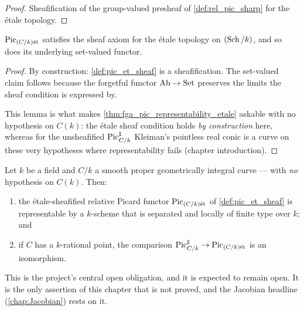 \begin{proof}\leanok
  Sheafification of the group-valued presheaf of \cref{def:rel_pic_sharp} for
  the \'etale topology.
\end{proof}

\begin{lemma}\leanok
  \label{lem:pic_et_is_sheaf}
  \(\operatorname{Pic}_{(C/k)\mathrm{\acute{e}t}}\) satisfies the sheaf axiom for the \'etale topology on
  \((\operatorname{Sch}/k)\), and so does its underlying set-valued functor.
\end{lemma}

\begin{proof}\leanok
  By construction: \cref{def:pic_et_sheaf} is a sheafification. The set-valued
  claim follows because the forgetful functor \(\mathrm{Ab} \to \mathrm{Set}\) preserves the
  limits the sheaf condition is expressed by.

  This lemma is what makes \cref{thm:fga_pic_representability_etale} askable with
  no hypothesis on \(C(k)\): the \'etale sheaf condition holds \emph{by
  construction} here, whereas for the unsheafified \(\operatorname{Pic}^\sharp_{C/k}\) Kleiman's
  pointless real conic is a curve on these very hypotheses where representability
  fails (chapter introduction).
\end{proof}

\begin{theorem}
  \label{thm:fga_pic_representability_etale}
  Let \(k\) be a field and \(C/k\) a smooth proper geometrically integral
  curve --- with \emph{no} hypothesis on \(C(k)\). Then:
  \begin{enumerate}
    \item the \'etale-sheafified relative Picard functor \(\operatorname{Pic}_{(C/k)\mathrm{\acute{e}t}}\) of
      \cref{def:pic_et_sheaf} is representable by a \(k\)-scheme that is
      separated and locally of finite type over \(k\); and
    \item if \(C\) has a \(k\)-rational point, the comparison
      \(\operatorname{Pic}^\sharp_{C/k} \to \operatorname{Pic}_{(C/k)\mathrm{\acute{e}t}}\) is an isomorphism.
  \end{enumerate}

  This is the project's central open obligation, and it is expected to remain
  open. It is the only assertion of this chapter that is not proved, and the
  Jacobian headline (\cref{chap:Jacobian}) rests on it.
\end{theorem}

